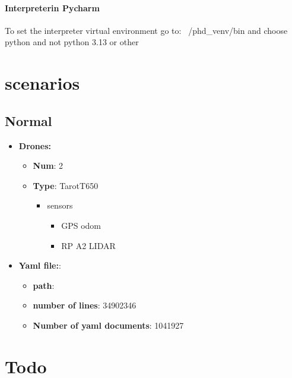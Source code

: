     \paragraph{Interpreterin Pycharm} To set the interpreter virtual environment go to: \texttt{~}/phd\_venv/bin and choose python and not python 3.13 or other


\section{scenarios}
    \subsection{Normal}
        \begin{itemize}
            \item \textbf{Drones:}
                \begin{itemize}
                    \item \textbf{Num}: 2
                    \item \textbf{Type}: TarotT650
                        \begin{itemize}
                            \item sensors
                                \begin{itemize}
                                    \item GPS odom
                                    \item RP A2 LIDAR
                                \end{itemize}
                        \end{itemize}
                \end{itemize}
            \item \textbf{Yaml file:}:
                \begin{itemize}
                    \item \textbf{path}: 
                    \item \textbf{number of lines}: 34902346
                    \item \textbf{Number of yaml documents}: 1041927
                \end{itemize}
        \end{itemize}


\section{Todo}
